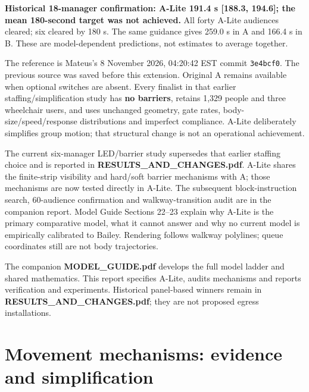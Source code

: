 \documentclass[11pt,a4paper]{article}
\newcommand{\code}[1]{{\small\nolinkurl{#1}}}
\begin{document}
\textbf{Historical 18-manager confirmation: A-Lite 191.4 s [188.3, 194.6]; the mean 180-second target was not achieved.} All forty A-Lite audiences cleared; six cleared by 180 s. The same guidance gives 259.0 s in A and 166.4 s in B. These are model-dependent predictions, not estimates to average together.


The reference is Mateus's 8 November 2026, 04:20:42 EST commit \code{3e4bcf0}. The previous source was saved before this extension. Original A remains available when optional switches are absent. Every finalist in that earlier staffing/simplification study has \textbf{no barriers}, retains 1,329 people and three wheelchair users, and uses unchanged geometry, gate rates, body-size/speed/response distributions and imperfect compliance. A-Lite deliberately simplifies group motion; that structural change is not an operational achievement.


The current six-manager LED/barrier study supersedes that earlier staffing choice and is reported in \textbf{RESULTS\_AND\_CHANGES.pdf}. A-Lite shares the finite-strip visibility and hard/soft barrier mechanisms with A; those mechanisms are now tested directly in A-Lite. The subsequent block-instruction search, 60-audience confirmation and walkway-transition audit are in the companion report. Model Guide Sections 22–23 explain why A-Lite is the primary comparative model, what it cannot answer and why no current model is empirically calibrated to Bailey. Rendering follows walkway polylines; queue coordinates still are not body trajectories.


The companion \textbf{MODEL\_GUIDE.pdf} develops the full model ladder and shared mathematics. This report specifies A-Lite, audits mechanisms and reports verification and experiments. Historical panel-based winners remain in \textbf{RESULTS\_AND\_CHANGES.pdf}; they are not proposed egress installations.


\section{Movement mechanisms: evidence and simplification}
\end{document}
